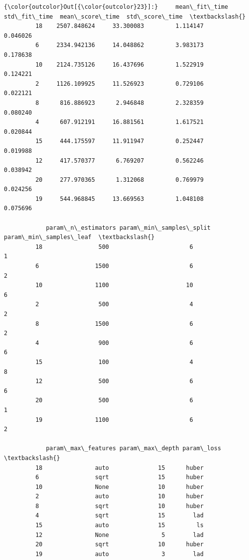 \documentclass[11pt]{article}
\begin{document}
\begin{Verbatim}[commandchars=\\\{\}]
{\color{outcolor}Out[{\color{outcolor}23}]:}     mean\_fit\_time  std\_fit\_time  mean\_score\_time  std\_score\_time  \textbackslash{}
         18    2507.848624     33.300083         1.114147        0.046026   
         6     2334.942136     14.048862         3.983173        0.178638   
         10    2124.735126     16.437696         1.522919        0.124221   
         2     1126.109925     11.526923         0.729106        0.022121   
         8      816.886923      2.946848         2.328359        0.080240   
         4      607.912191     16.881561         1.617521        0.020844   
         15     444.175597     11.911947         0.252447        0.019988   
         12     417.570377      6.769207         0.562246        0.038942   
         20     277.970365      1.312068         0.769979        0.024256   
         19     544.968845     13.669563         1.048108        0.075696   
         
            param\_n\_estimators param\_min\_samples\_split param\_min\_samples\_leaf  \textbackslash{}
         18                500                       6                      1   
         6                1500                       6                      2   
         10               1100                      10                      6   
         2                 500                       4                      2   
         8                1500                       6                      2   
         4                 900                       6                      6   
         15                100                       4                      8   
         12                500                       6                      6   
         20                500                       6                      1   
         19               1100                       6                      2   
         
            param\_max\_features param\_max\_depth param\_loss  \textbackslash{}
         18               auto              15      huber   
         6                sqrt              15      huber   
         10               None              10      huber   
         2                auto              10      huber   
         8                sqrt              10      huber   
         4                sqrt              15        lad   
         15               auto              15         ls   
         12               None               5        lad   
         20               sqrt              10      huber   
         19               auto               3        lad   
         

\end{Verbatim}
\end{document}
